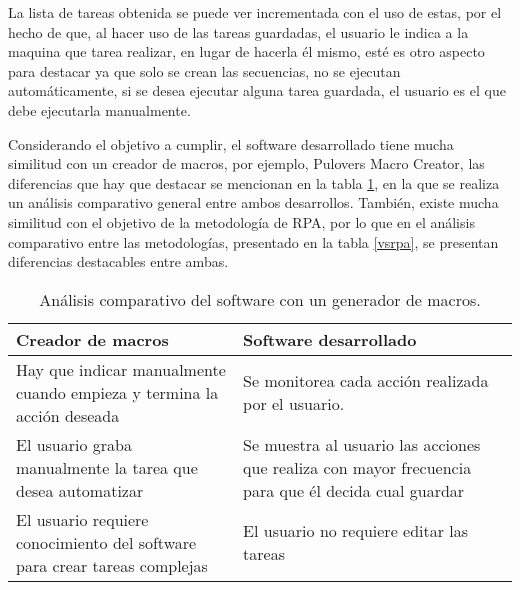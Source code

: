 La lista de tareas obtenida se puede ver incrementada con el uso de estas, por 
 el hecho de que, al hacer uso de las tareas guardadas, el usuario le indica a 
 la maquina que tarea realizar, en lugar de hacerla \'el mismo, est\'e es otro 
 aspecto para destacar ya que solo se crean las secuencias, no se ejecutan 
 autom\'aticamente, si se desea ejecutar alguna tarea guardada, el usuario es
 el que debe ejecutarla manualmente.


Considerando el objetivo a cumplir, el software desarrollado tiene mucha 
 similitud con un creador de macros, por 
 ejemplo, Pulovers Macro Creator, las diferencias que hay que destacar se 
 mencionan en la tabla \ref{vsmacros}, en la que se realiza un an\'alisis 
 comparativo general entre ambos desarrollos. Tambi\'en, existe mucha 
 similitud con el objetivo de la metodolog\'ia de RPA, 
 por lo que en el an\'alisis 
 comparativo entre las metodolog\'ias, presentado en la tabla \ref{vsrpa}, se 
 presentan diferencias destacables entre ambas.
 

\begin{table}[h]
\centering
\caption{An\'alisis comparativo del software con un generador de macros.}
\begin{tabular}{m{6cm}|m{6cm}}
\hline
\textbf{Creador de macros} 	&	\textbf{Software desarrollado} \\
\hline
Hay que indicar manualmente cuando empieza y termina la acci\'on deseada	
 &	
Se monitorea cada acci\'on realizada por el usuario.\\
\hline

El usuario graba manualmente la tarea que desea automatizar	
 &
Se muestra al usuario las acciones que realiza con mayor frecuencia para que
  \'el decida cual guardar\\
\hline

El usuario requiere conocimiento del software para crear tareas complejas 	
 &
El usuario no requiere editar las tareas\\
\hline
\end{tabular}

\label{vsmacros}
\end{table}



